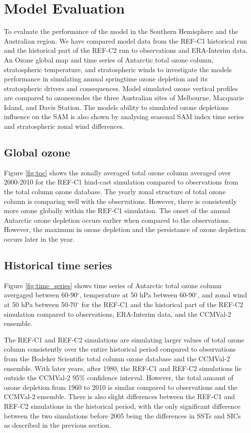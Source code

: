 \section{Model Evaluation}
To evaluate the performance of the model in the Southern Hemisphere and the Australian region. We have compared model data from the REF-C1 historical run and the historical part of the REF-C2 run to observations and ERA-Interim data. An Ozone global map and time series of Antarctic total ozone column, stratospheric temperature, and stratospheric winds to investigate the models performance in simulating annual springtime ozone depletion and its stratospheric drivers and consequences. Model simulated ozone vertical profiles are compared to ozonesondes the three Australian sites of Melbourne, Macquarie Island, and Davis Station. The models ability to simulated ozone depletions influence on the SAM is also shown by analysing seasonal SAM index time series and stratospheric zonal wind differences.

\subsection{Global ozone}
Figure \ref{fig:toc} shows the zonally averaged total ozone column averaged over 2000-2010 for the REF-C1 hind-cast simulation compared to observations from the total column ozone database. The yearly zonal structure of total ozone column is comparing well with the observations. However, there is consistently more ozone globally within the REF-C1 simulation. The onset of the annual Antarctic ozone depletion occurs earlier when compared to the observations. However, the maximum in ozone depletion and the persistance of ozone depletion occurs later in the year.

\subsection{Historical time series}
Figure \ref{fig:time_series} shows time series of Antarctic total ozone column avergaged between 60-90$^{\circ}$, temperature at 50 hPa between 60-90$^{\circ}$, and zonal wind at 50 hPa between 50-70$^{\circ}$ for the REF-C1 and the historical part of the REF-C2 simulation compared to observations, ERA-Interim data, and the CCMVal-2 ensemble.

The REF-C1 and REF-C2 simulations are simulating larger values of total ozone column consistently over the entire historical period compared to observations from the Bodeker Scientific total column ozone database and the CCMVal-2 ensemble. With later years, after 1980, the REF-C1 and REF-C2 simulations lie outside the CCMVal-2 95\% confidence interval. However, the total amount of ozone depletion from 1960 to 2010 is similar compared to observations and the CCMVal-2 ensemble. There is also slight differences between the REF-C1 and REF-C2 simulations in the historical period, with the only significant difference between the two simulations before 2005 being the differences in SSTs and SICs as described in the previous section. 

